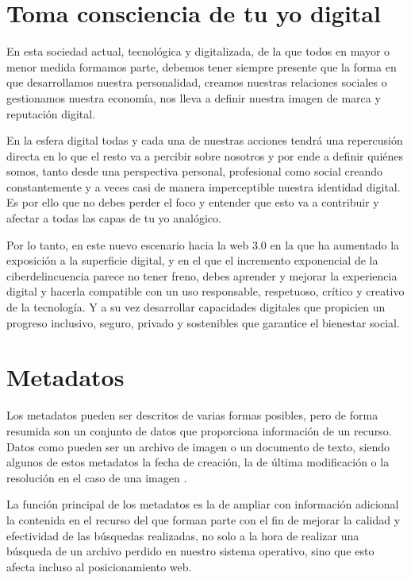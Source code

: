\documentclass[
  a4paper,
  openany]{book}
\begin{document}
\hypertarget{toma-consciencia-de-tu-yo-digital}{%
\section{Toma consciencia de tu yo digital}\label{toma-consciencia-de-tu-yo-digital}}

En esta sociedad actual, tecnológica y digitalizada, de la que todos en mayor o menor medida formamos parte, debemos tener siempre presente que la forma en que desarrollamos nuestra personalidad, creamos nuestras relaciones sociales o gestionamos nuestra economía, nos lleva a definir nuestra imagen de marca y reputación digital.

En la esfera digital todas y cada una de nuestras acciones tendrá una repercusión directa en lo que el resto va a percibir sobre nosotros y por ende a definir quiénes somos, tanto desde una perspectiva personal, profesional como social creando constantemente y a veces casi de manera imperceptible nuestra identidad digital. Es por ello que no debes perder el foco y entender que esto va a contribuir y afectar a todas las capas de tu yo analógico.

Por lo tanto, en este nuevo escenario hacia la web 3.0 en la que ha aumentado la exposición a la superficie digital, y en el que el incremento exponencial de la ciberdelincuencia parece no tener freno, debes aprender y mejorar la experiencia digital y hacerla compatible con un uso responsable, respetuoso, crítico y creativo de la tecnología. Y a su vez desarrollar capacidades digitales que propicien un progreso inclusivo, seguro, privado y sostenibles que garantice el bienestar social.

\hypertarget{metadatos}{%
\section{Metadatos}\label{metadatos}}

Los metadatos pueden ser descritos de varias formas posibles, pero de forma resumida son un conjunto de datos que proporciona información de un recurso. Datos como pueden ser un archivo de imagen o un documento de texto, siendo algunos de estos metadatos la fecha de creación, la de última modificación o la resolución en el caso de una imagen \citep{WIKI-meta}.

La función principal de los metadatos es la de ampliar con información adicional la contenida en el recurso del que forman parte con el fin de mejorar la calidad y efectividad de las búsquedas realizadas, no solo a la hora de realizar una búsqueda de un archivo perdido en nuestro sistema operativo, sino que esto afecta incluso al posicionamiento web.
\end{document}
